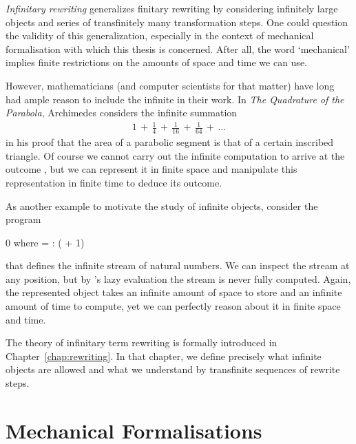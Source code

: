\emph{Infinitary rewriting} generalizes finitary rewriting by
considering infinitely large objects and series of transfinitely many
transformation steps. One could question the validity of this
generalization, especially in the context of mechanical formalisation
with which this thesis is concerned. After all, the word `mechanical'
implies finite restrictions on the amounts of space and time we can
use.

However, mathematicians (and computer scientists for that matter) have
long had ample reason to include the infinite in their work. In
\emph{The Quadrature of the Parabola}, Archimedes considers the
infinite summation
\begin{align*}
  1 \,+\, \frac{1}{4} \,+\, \frac{1}{16} \,+\, \frac{1}{64} \,+\, \ldots
\end{align*}
in his proof that the area of a parabolic segment is  that
of a certain inscribed triangle. Of course we cannot carry out the
infinite computation to arrive at the outcome , but we can
represent it in finite space and manipulate this representation in
finite time to deduce its outcome.

As another example to motivate the study of infinite objects, consider
the \Haskell program
\begin{singlespace}
\begin{coqdoccode}
\coqdocnoindent
{} 0 \coqdocindent{0.2em} \textsf{where}
\coqdocindent{0.2em}   =
 : 
( + 1)\coqdoceol
\end{coqdoccode}
\end{singlespace}
that defines the infinite stream of natural numbers. We can inspect
the stream at any position, but by \Haskell's lazy evaluation the
stream is never fully computed. Again, the represented object takes an
infinite amount of space to store and an infinite amount of time to
compute, yet we can perfectly reason about it in finite space and
time.

The theory of infinitary term rewriting is formally introduced in
Chapter~\ref{chap:rewriting}. In that chapter, we define precisely
what infinite objects are allowed and what we understand by
transfinite sequences of rewrite steps.


\section*{Mechanical Formalisations}

